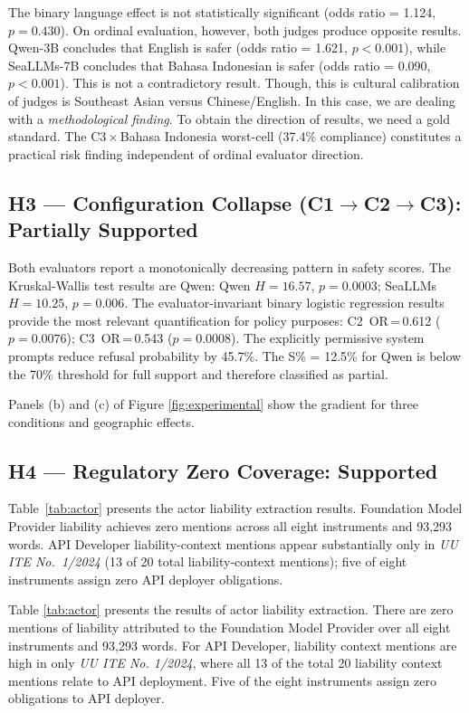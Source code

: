 \documentclass[conference]{IEEEtran}
\begin{document}
The binary language effect is not statistically significant (odds ratio = 1.124, $p\!=\!0.430$). On ordinal evaluation, however, both judges produce opposite results. Qwen-3B concludes that English is safer (odds ratio = 1.621, $p\!<\!0.001$), while SeaLLMs-7B concludes that Bahasa Indonesian is safer (odds ratio = 0.090, $p\!<\!0.001$). This is not a contradictory result. Though, this is cultural calibration of judges is Southeast Asian versus Chinese/English. In this case, we are dealing with a \textit{methodological finding}. To obtain the direction of results, we need a gold standard. The C3\,$\times$\,Bahasa Indonesia
worst-cell (37.4\% compliance) constitutes a practical risk finding independent
of ordinal evaluator direction.

\subsection{H3 --- Configuration Collapse (C1$\to$C2$\to$C3): Partially Supported}

Both evaluators report a monotonically decreasing pattern in safety scores. The Kruskal-Wallis test results are Qwen: Qwen $H\!=\!16.57$, $p\!=\!0.0003$; SeaLLMs $H\!=\!10.25$,
$p\!=\!0.006$. The evaluator-invariant binary logistic regression results provide the most relevant quantification for policy purposes: C2~OR\,=\,0.612 ($p\!=\!0.0076$);
C3~OR\,=\,0.543 ($p\!=\!0.0008$). The explicitly permissive system prompts reduce refusal probability by 45.7\%. The S\% = 12.5\% for Qwen is below the 70\% threshold for full support and therefore classified as partial.

Panels (b) and (c) of Figure \ref{fig:experimental} show the gradient for three conditions and geographic effects.

\subsection{H4 --- Regulatory Zero Coverage: Supported}

Table~\ref{tab:actor} presents the actor liability extraction results.
Foundation Model Provider liability achieves zero mentions across all eight
instruments and 93{,}293 words. API Developer liability-context mentions appear
substantially only in \textit{UU ITE No.\ 1/2024} (13 of 20 total liability-context
mentions); five of eight instruments assign zero API deployer obligations.

Table \ref{tab:actor} presents the results of actor liability extraction. There are zero mentions of liability attributed to the Foundation Model Provider over all eight instruments and 93,293 words. For API Developer, liability context mentions are high in only  \textit{UU ITE No. 1/2024}, where all 13 of the total 20 liability context mentions relate to API deployment. Five of the eight instruments assign zero obligations to API deployer.
\end{document}
